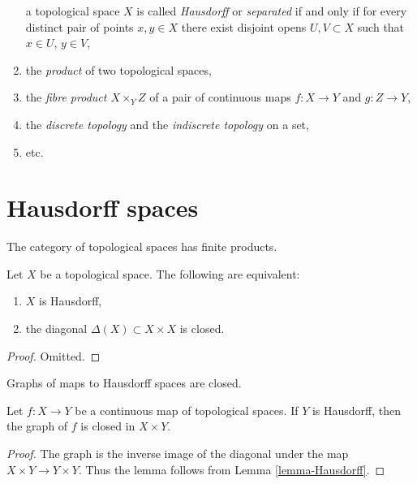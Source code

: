 \begin{enumerate}
a topological space $X$ is called {\it Hausdorff} or {\it separated}
if and only if for every distinct pair of points $x, y \in X$ there exist
disjoint opens $U, V \subset X$ such that $x \in U$, $y \in V$,
\item the {\it product} of two topological spaces,
\label{item-product}
\item
\label{item-fibre-product}
the {\it fibre product $X \times_Y Z$} of a pair of continuous maps
$f : X \to Y$ and $g : Z \to Y$,
\item
\label{item-discrete-indiscrete}
the {\it discrete topology} and the {\it indiscrete topology} on a set,
\item etc.
\end{enumerate}



\section{Hausdorff spaces}
\label{section-Hausdorff}

\noindent
The category of topological spaces has finite products.

\begin{lemma}
\label{lemma-Hausdorff}
Let $X$ be a topological space. The following are equivalent:
\begin{enumerate}
\item $X$ is Hausdorff,
\item the diagonal $\Delta(X) \subset X \times X$ is closed.
\end{enumerate}
\end{lemma}

\begin{proof}
Omitted.
\end{proof}

\begin{lemma}
\label{lemma-graph-closed}
\begin{slogan}
Graphs of maps to Hausdorff spaces are closed.
\end{slogan}
Let $f : X \to Y$ be a continuous map of topological spaces.
If $Y$ is Hausdorff, then the graph of $f$ is closed in $X \times Y$.
\end{lemma}

\begin{proof}
The graph is the inverse image of the diagonal under the map
$X \times Y \to Y \times Y$. Thus the lemma follows from
Lemma \ref{lemma-Hausdorff}.
\end{proof}

